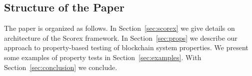 

\subsection{Structure of the Paper}

The paper is organized as follows. In Section~\ref{sec:scorex} we give details on architecture of the Scorex framework. In Section~\ref{sec:props} we describe our approach to property-based testing of blockchain system properties. We present some examples of property tests in Section~\ref{sec:examples}. With Section~\ref{sec:conclusion} we conclude.
